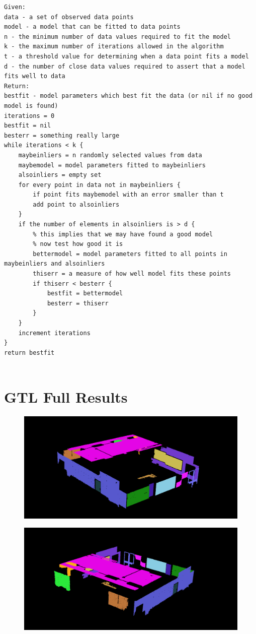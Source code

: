 \begin{lstlisting}
Given:
data - a set of observed data points
model - a model that can be fitted to data points
n - the minimum number of data values required to fit the model
k - the maximum number of iterations allowed in the algorithm
t - a threshold value for determining when a data point fits a model
d - the number of close data values required to assert that a model fits well to data
Return:
bestfit - model parameters which best fit the data (or nil if no good model is found)
iterations = 0
bestfit = nil
besterr = something really large
while iterations < k {
	maybeinliers = n randomly selected values from data
	maybemodel = model parameters fitted to maybeinliers
	alsoinliers = empty set
	for every point in data not in maybeinliers {
		if point fits maybemodel with an error smaller than t
		add point to alsoinliers
	}
	if the number of elements in alsoinliers is > d {
		% this implies that we may have found a good model
		% now test how good it is
		bettermodel = model parameters fitted to all points in maybeinliers and alsoinliers
		thiserr = a measure of how well model fits these points
		if thiserr < besterr {
			bestfit = bettermodel
			besterr = thiserr
		}
	}
	increment iterations
}
return bestfit


\end{lstlisting}


\chapter{GTL Full Results}

\begin{figure}[H]
\centering
\includegraphics[width=1\linewidth]{Includes/images/Appendix/GTL-Full-seg}
\caption{}
\label{fig:GTL-Full-seg}
\end{figure}

\begin{figure}[H]
	\centering
	\includegraphics[width=1\linewidth]{Includes/images/Appendix/GTL-Full-seg2}
	\caption{}
	\label{fig:GTL-Full-seg2}
\end{figure}


